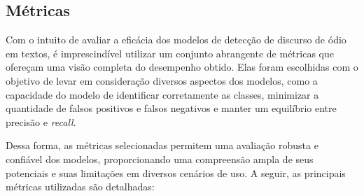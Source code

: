 \documentclass[conference]{IEEEtran}
\begin{document}
\subsection{Métricas}

Com o intuito de avaliar a eficácia dos modelos de detecção de discurso de ódio em textos, é imprescindível utilizar um conjunto abrangente de métricas que ofereçam uma visão completa do desempenho obtido. Elas foram escolhidas com o objetivo de levar em consideração diversos aspectos dos modelos, como a capacidade do modelo de identificar corretamente as classes, minimizar a quantidade de falsos positivos e falsos negativos e manter um equilíbrio entre precisão e \textit{recall}.

Dessa forma, as métricas selecionadas permitem uma avaliação robusta e confiável dos modelos, proporcionando uma compreensão ampla de seus potenciais e suas limitações em diversos cenários de uso. A seguir, as principais métricas utilizadas são detalhadas:
\end{document}
